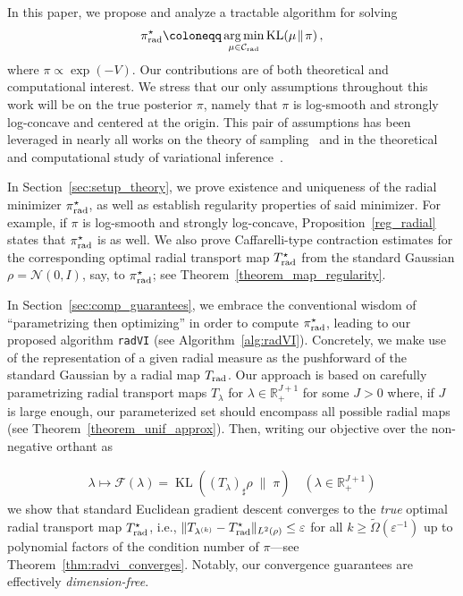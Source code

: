 \documentclass[twoside]{article}
\newcommand{\cC}{\mathcal{C}}
\newcommand{\cF}{\mathcal{F}}
\newcommand{\cN}{\mathcal{N}}
\newcommand{\1}{\mathds{1}}
\newcommand{\kl}[2]{\KL(#1 \!\;\|\; \!#2)}
\newcommand{\R}{\mathbb{R}}
\renewcommand{\epsilon}{\varepsilon}
\newcommand*{\defeq}{\coloneqq}
\DeclareMathOperator*{\argmin}{arg\,min}
\DeclareMathOperator*{\KL}{KL}
\newcommand{\pirad}{\pi_{\rm rad}}
\theoremstyle{plain}
\theoremstyle{definition}
\theoremstyle{remark}
\begin{document}
In this paper, we propose and analyze a tractable algorithm for solving
\begin{align*}
    \pi_{\rm rad}^\star \defeq  \argmin_{\mu \in \cC_{\rm rad}}\kl{\mu}{\pi}\,,
\end{align*}
where $\pi \propto \exp(-V)$. Our contributions are of both theoretical and computational interest. We stress that our only assumptions throughout this work will be on the true posterior $\pi$, namely that $\pi$ is log-smooth and strongly log-concave {and centered at the origin}. This pair of assumptions has been leveraged in nearly all works on the theory of sampling~\citep{ChewiBook} and in the theoretical and computational study of variational inference~\citep{Lambert2022, arnese2024convergence, Lacker2024, lavenant2024convergence, JiaChePoo24MFVI}.

In Section~\ref{sec:setup_theory}, we prove existence and uniqueness of the radial minimizer $\pirad^\star$, as well as establish regularity properties of said minimizer. For example, if $\pi$ is log-smooth and strongly log-concave, {Proposition}~\ref{reg_radial} states that $\pirad^\star$ is as well. We also prove Caffarelli-type contraction estimates \citep{Caffarelli2000} for the corresponding optimal radial transport map $T_{\rm rad}^\star$ from the standard Gaussian $\rho = \cN(0,I)$, say, to $\pirad^\star$; see Theorem~\ref{theorem_map_regularity}.

In Section~\ref{sec:comp_guarantees}, we embrace the conventional wisdom of ``parametrizing then optimizing'' in order to compute $\pirad^\star$, leading to our proposed algorithm \texttt{radVI} (see Algorithm~\ref{alg:radVI}). Concretely, we make use of the representation of a given radial measure as the pushforward of the standard Gaussian by a radial map $T_{\rm rad}$. Our approach is based on carefully parametrizing radial transport maps $T_\lambda$ for $\lambda \in \R^{J+1}_+$ for some $J > 0$ where, if $J$ is large enough, our parameterized set should encompass all possible radial maps (see Theorem~\ref{theorem_unif_approx}). Then, writing our objective over the non-negative orthant as

\begin{align*}
    \lambda \mapsto \cF(\lambda) = \kl{(T_\lambda)_\sharp\rho}{\pi} \quad (\lambda\in\R^{J+1}_+)
\end{align*}
we show that standard Euclidean gradient descent converges to the \emph{true} optimal radial transport map $T^\star_{\rm rad}$, i.e., $ \|T_{\lambda^{(k)}} - T^\star_{\rm rad}\|_{L^2(\rho)} \leq \epsilon$ for all $k \ge \widetilde\Omega(\epsilon^{-1})$ up to polynomial factors of the condition number of $\pi$---see Theorem~\ref{thm:radvi_converges}.  {Notably, our convergence guarantees are effectively \emph{dimension-free}}.
\end{document}
